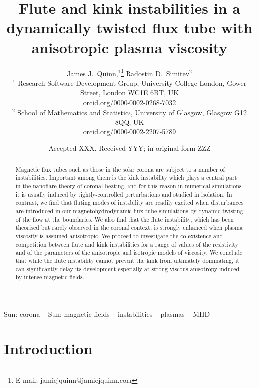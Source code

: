 \documentclass[fleqn,usenatbib]{mnras}
\title{Flute and kink instabilities in a dynamically twisted
    flux tube with anisotropic plasma viscosity}
\author[J.~Quinn and R.~Simitev]{
James J.~Quinn,$^{1}$\thanks{E-mail: jamiejquinn@jamiejquinn.com}
Radostin D.~Simitev$^{2}$
\\
$^{1}$ Research Software Development Group, University College London, Gower Street, London WC1E 6BT, UK \\
\href{https://orcid.org/0000-0002-0268-7032}{orcid.org/0000-0002-0268-7032} \\
$^2$ School of Mathematics and Statistics, University of Glasgow,
Glasgow G12 8QQ,
UK \\ \href{https://orcid.org/0000-0002-2207-5789}{orcid.org/0000-0002-2207-5789}\\
}
\date{Accepted XXX. Received YYY; in original form ZZZ}
\begin{document}
\label{firstpage}
\pagerange{\pageref{firstpage}--\pageref{lastpage}}
\maketitle


\graphicspath{{images/kink_instability_straight/}}

\begin{abstract}
Magnetic flux tubes such as those in the solar corona are subject to a number
of instabilities. Important among them is the kink instability which plays
a central part in the nanoflare theory of coronal heating, and for this reason
in numerical simulations it is usually induced by tightly-controlled
perturbations and studied in isolation. In contrast, we find that
fluting modes of instability are readily excited when disturbances are
introduced in our magnetohydrodynamic flux tube simulations by dynamic
twisting of the flow at the boundaries. We also find that the flute instability, which has been 
theorised but rarely observed in the coronal context,  is strongly enhanced
when plasma viscosity is assumed anisotropic. We proceed to investigate the
co-existence and competition between flute and kink instabilities for a range
of values of the resistivity and of the parameters of the anisotropic and
isotropic models of viscosity. We conclude that while the flute instability
cannot prevent the kink from ultimately dominating, it can significantly delay
its development especially at strong viscous anisotropy induced by intense
magnetic fields.
\end{abstract}

\begin{keywords}
Sun: corona -- Sun: magnetic fields -- instabilities -- plasmas -- MHD
\end{keywords}

\section{Introduction}
\end{document}

